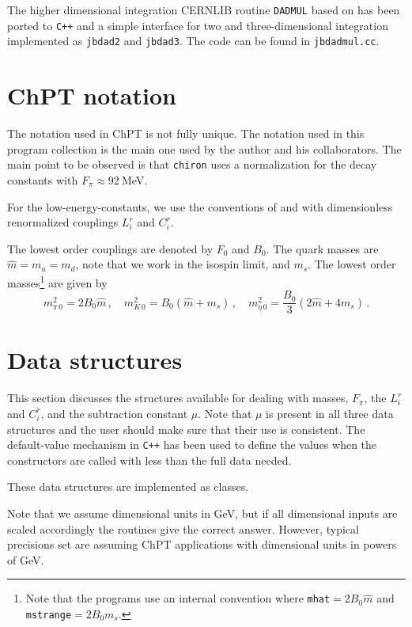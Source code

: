 \documentclass[12pt,a4paper]{article}
\begin{document}
The higher dimensional integration \textsc{CERNLIB} routine \texttt{DADMUL}
based on \cite{radmulpaper} has been ported to \texttt{C++}
and a simple interface for two and three-dimensional integration
implemented as \texttt{jbdad2} and \texttt{jbdad3}.
The code can be found in \texttt{jbdadmul.cc}.

\section{ChPT notation}
\label{chptnotation}

The notation used in ChPT is not fully unique. The notation used
in this program collection is the main one used by the author
and his collaborators. The main point to be observed is that \texttt{chiron}
uses a normalization for the decay constants with $F_\pi\approx92~$MeV.

For the low-energy-constants, we use the conventions of \cite{Gasser:1984gg}
and \cite{Bijnens:1999sh,Bijnens:1999hw} with dimensionless
renormalized couplings $L_i^r$ and $C_i^r$.

The lowest order couplings are denoted by $F_0$ and $B_0$. The quark masses
are $\hat m=m_u=m_d$, note that we work in the isospin limit, and $m_s$.
The lowest order masses\footnote{Note that the programs use an internal
convention where \texttt{mhat}$=2B_0\hat m$ and \texttt{mstrange}$=2B_0 m_s$.} 
 are given by
\begin{equation}
\label{lomasses}
m_{\pi\,0}^2 = 2B_0\hat m\,,
\quad
m_{K\,0}^2 = B_0\left(\hat m+m_s\right)\,,\quad
m_{\eta\,0}^2 = \frac{B_0}{3}\left(2\hat m+4m_s\right)\,.
\end{equation}

\section{Data structures}
\label{datastructures}

This section discusses the structures available for dealing with masses,
$F_\pi$, the $L_i^r$ and $C_i^r$, and the subtraction constant $\mu$.
Note that $\mu$ is present in all three data structures and the user should
make sure that their use is consistent.
The default-value mechanism in \texttt{C++} has been used to define the values
when the constructors are called with less than the full data needed.

These data structures are implemented as classes.

Note that we assume dimensional
units in GeV, but if all dimensional inputs are scaled accordingly
the routines give the correct answer. However, typical precisions set
are assuming ChPT applications with dimensional units in powers of GeV.
\end{document}
